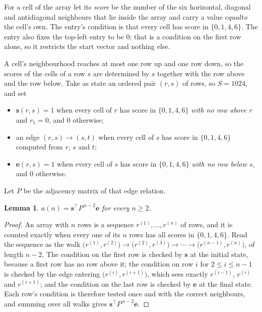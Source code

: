 \documentclass[11pt,a4paper]{article}
\theoremstyle{plain}
\newtheorem{lemma}[theorem]{Lemma}
\theoremstyle{definition}
\begin{document}
For a cell of the array let its \emph{score} be the number of the six horizontal, diagonal and antidiagonal neighbours that lie inside
the array and carry a value $equal to$ the cell's own. The entry's condition is that every cell
has score in $\{0,1,4,6\}$. The entry also fixes the top-left entry to be $0$; that is a condition on the first row alone, so it restricts the start vector and nothing else.

A cell's neighbourhood reaches at most one row up and one row down, so the scores of the
cells of a row $s$ are determined by $s$ together with the row above and the row below.
Take as state an ordered pair $(r,s)$ of rows, so $S=1024$, and set
\begin{itemize}
\item $\mathbf{s}(r,s)=1$ when every cell of $r$ has score in $\{0,1,4,6\}$ \emph{with no row
above $r$} and $r_1=0$, and $0$ otherwise;
\item an edge $(r,s)\to(s,t)$ when every cell of $s$ has score in $\{0,1,4,6\}$ computed from
$r$, $s$ and $t$;
\item $\mathbf{e}(r,s)=1$ when every cell of $s$ has score in $\{0,1,4,6\}$ \emph{with no row
below $s$}, and $0$ otherwise.
\end{itemize}
Let $P$ be the adjacency matrix of that edge relation.

\begin{lemma}\label{lem:walk}
$a(n)=\mathbf{s}^{\!\top}P^{\,n-2}\mathbf{e}$ for every $n\ge2$.
\end{lemma}

\begin{proof}
An array with $n$ rows is a sequence $r^{(1)},\dots,r^{(n)}$ of rows, and it is counted
exactly when every one of its $n$ rows has all scores in $\{0,1,4,6\}$. Read the sequence as the
walk $\bigl(r^{(1)},r^{(2)}\bigr)\to\bigl(r^{(2)},r^{(3)}\bigr)\to\cdots\to
\bigl(r^{(n-1)},r^{(n)}\bigr)$, of length $n-2$. The condition on the first row is
checked by $\mathbf{s}$ at the initial state, because a first row has no row above it; the
condition on row $i$ for $2\le i\le n-1$ is checked by the edge entering
$\bigl(r^{(i)},r^{(i+1)}\bigr)$, which sees exactly $r^{(i-1)}$, $r^{(i)}$ and
$r^{(i+1)}$; and the condition on the last row is checked by $\mathbf{e}$ at the final
state. Each row's condition is therefore tested once and with the correct neighbours, and
summing over all walks gives $\mathbf{s}^{\!\top}P^{\,n-2}\mathbf{e}$.
\end{proof}
\end{document}
